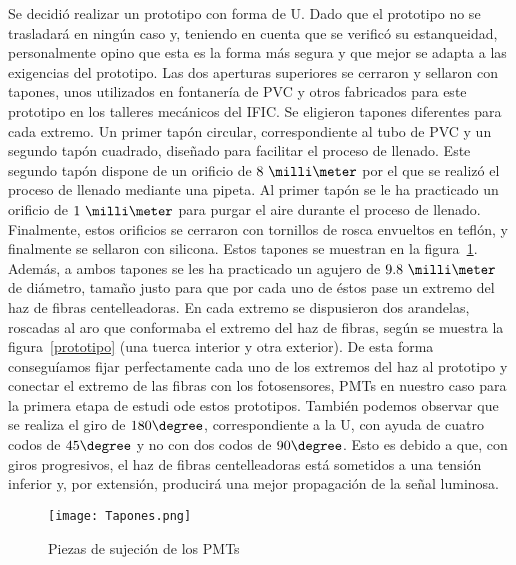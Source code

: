 Se decidió realizar un prototipo con forma de U. Dado que el prototipo no se trasladará en ningún caso y, teniendo en cuenta que se verificó su estanqueidad, personalmente opino que esta es la forma más segura y que mejor se adapta a las exigencias del prototipo. Las dos aperturas superiores se cerraron  y sellaron con tapones, unos utilizados en fontanería de PVC y otros fabricados para este prototipo en los talleres mecánicos del IFIC. Se eligieron tapones diferentes para cada extremo. Un primer tapón circular,  correspondiente al tubo de PVC y un segundo tapón cuadrado, diseñado para facilitar el proceso de llenado. Este segundo tapón dispone de  un orificio de $8~\milli\meter$ por el que se realizó el proceso de llenado  mediante una pipeta. Al primer tapón  se le ha practicado  un orificio de $1~\milli\meter$ para purgar el aire durante el  proceso de llenado. Finalmente, estos orificios se cerraron con  tornillos de rosca envueltos en teflón, y finalmente se sellaron con silicona. Estos tapones se muestran en la figura~\ref{tapones}.
Además, a ambos tapones se les ha practicado un agujero de $9.8~\milli\meter$ de diámetro, tamaño justo para que por cada uno de éstos pase un extremo del haz de fibras centelleadoras. En cada extremo se dispusieron dos arandelas, roscadas al aro que conformaba el extremo del haz de fibras, según se muestra  la figura~\ref{prototipo} (una tuerca interior y otra exterior). De esta forma conseguíamos fijar perfectamente cada uno de los extremos del haz al prototipo y conectar el extremo de las fibras con los fotosensores, PMTs en nuestro caso para la primera etapa de estudi ode estos prototipos. 
También podemos observar que se realiza el giro de $180\degree$, correspondiente a la U, con ayuda de cuatro codos de $45\degree$ y no con dos codos de $90\degree$. Esto es debido a que, con giros progresivos, el haz de fibras centelleadoras está sometidos a una tensión inferior y, por extensión, producirá una mejor propagación de la señal luminosa.

\begin{figure}[hbtp]
\centering
\texttt{[image: Tapones.png]}\\
\caption{ Piezas de sujeción de los PMTs\label{tapones}
}
\end{figure}



